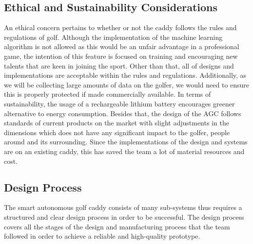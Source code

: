 \documentclass[11pt,landscape]{article}
\begin{document}
\begin{multicols}{2}
\subsection{Ethical and Sustainability Considerations}
An ethical concern pertains to whether or not the caddy follows the rules and
regulations of golf. Although the implementation of the machine
learning algorithm is not allowed as this would be an unfair advantage in a
professional game, the intention of this feature is focused on training and
encouraging new talents that are keen in joining the sport. Other than that, all
of designs and implementations are acceptable within the rules and regulations.
Additionally, as we will be collecting large amounts of data on the golfer, we
would need to ensure this is properly protected if made commercially available.
In terms of sustainability, the usage of a rechargeable lithium battery
encourages greener alternative to energy consumption. Besides that, the design
of the AGC follows standards of current products on the market with slight
adjustments in the dimensions which does not have any significant impact to the
golfer, people around and its surrounding. Since the implementations of the
design and systems are on an existing caddy, this has saved the team a lot of
material resources and cost.  

\subsection{Design Process}
The smart autonomous golf caddy consists of many sub-systems thus requires a
structured and clear design process in order to be successful. The design
process covers all the stages of the design and manufacturing process that the
team followed in order to achieve a reliable and high-quality prototype.


\end{multicols}
\end{document}
